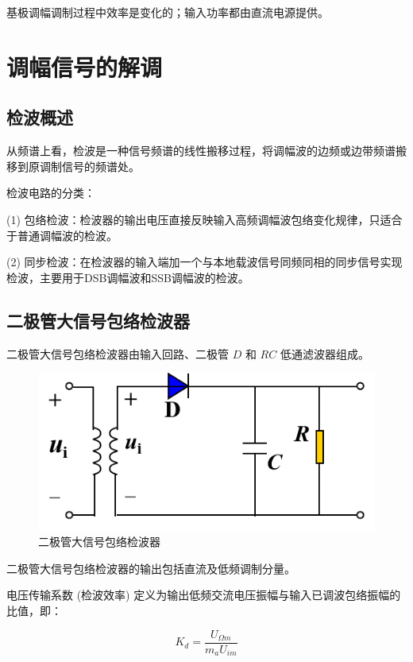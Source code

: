 基极调幅调制过程中效率是变化的；输入功率都由直流电源提供。

\section{调幅信号的解调}

\subsection{检波概述}

从频谱上看，检波是一种信号频谱的线性搬移过程，将调幅波的边频或边带频谱搬移到原调制信号的频谱处。

检波电路的分类：

(1) 包络检波：检波器的输出电压直接反映输入高频调幅波包络变化规律，只适合于普通调幅波的检波。

(2) 同步检波：在检波器的输入端加一个与本地载波信号同频同相的同步信号实现检波，主要用于DSB调幅波和SSB调幅波的检波。

\subsection{二极管大信号包络检波器}

二极管大信号包络检波器由输入回路、二极管 $D$ 和 $RC$ 低通滤波器组成。

\begin{figure}[htbp]
    \centering
    \includegraphics[scale=0.5]{image/Picture17.png}
    \caption{二极管大信号包络检波器}
\end{figure}

二极管大信号包络检波器的输出包括直流及低频调制分量。

电压传输系数 (检波效率) 定义为输出低频交流电压振幅与输入已调波包络振幅的比值，即：

\begin{equation}
    K_d = \frac{U_{\Omega m}}{m_a U_{im}}
\end{equation}

